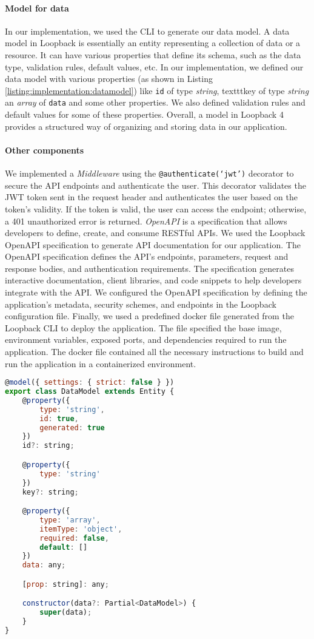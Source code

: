 \paragraph{Model for data}
In our implementation, we used the CLI to generate our data model.
A data model in Loopback is essentially an entity representing a collection of data or a resource. It can have various properties that define its schema, such as the data type, validation rules, default values, etc.
In our implementation, we defined our data model with various properties (as shown in Listing \ref{listing:implementation:datamodel}) like \texttt{id} of type \textit{string}, texttt{key} of type \textit{string} an \textit{array} of \texttt{data} and some other properties.
We also defined validation rules and default values for some of these properties.
Overall, a model in Loopback 4 provides a structured way of organizing and storing data in our application.

\paragraph{Other components}
We implemented a \textit{Middleware} using the \texttt{@authenticate(`jwt')} decorator to secure the API endpoints and authenticate the user. 
This decorator validates the JWT token sent in the request header and authenticates the user based on the token's validity. 
If the token is valid, the user can access the endpoint; otherwise, a 401 unauthorized error is returned.
\textit{OpenAPI} is a specification that allows developers to define, create, and consume RESTful APIs. 
We used the Loopback OpenAPI specification to generate API documentation for our application. 
The OpenAPI specification defines the API's endpoints, parameters, request and response bodies, and authentication requirements. 
The specification generates interactive documentation, client libraries, and code snippets to help developers integrate with the API. 
We configured the OpenAPI specification by defining the application's metadata, security schemes, and endpoints in the Loopback configuration file.
Finally, we used a predefined docker file generated from the Loopback CLI to deploy the application. 
The file specified the base image, environment variables, exposed ports, and dependencies required to run the application. 
The docker file contained all the necessary instructions to build and run the application in a containerized environment.

\begin{lstlisting}[language=JavaScript, caption=data.model.ts, label=listing:implementation:datamodel]
@model({ settings: { strict: false } })
export class DataModel extends Entity {
    @property({
        type: 'string',
        id: true,
        generated: true
    })
    id?: string;

    @property({
        type: 'string'
    })
    key?: string;

    @property({
        type: 'array',
        itemType: 'object',
        required: false,
        default: []
    })
    data: any;

    [prop: string]: any;

    constructor(data?: Partial<DataModel>) {
        super(data);
    }
}
\end{lstlisting}
\clearpage
